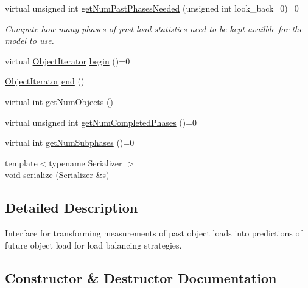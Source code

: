 \begin{DoxyCompactItemize}
virtual unsigned int \hyperlink{structvt_1_1vrt_1_1collection_1_1balance_1_1_load_model_ac061725720a2017908090863080b70e5}{get\+Num\+Past\+Phases\+Needed} (unsigned int look\+\_\+back=0)=0
\begin{DoxyCompactList}\small\item\em Compute how many phases of past load statistics need to be kept availble for the model to use. \end{DoxyCompactList}\item 
virtual \hyperlink{structvt_1_1vrt_1_1collection_1_1balance_1_1_object_iterator}{Object\+Iterator} \hyperlink{structvt_1_1vrt_1_1collection_1_1balance_1_1_load_model_a6ca139b4f14d79d1d59b46016efae221}{begin} ()=0
\item 
\hyperlink{structvt_1_1vrt_1_1collection_1_1balance_1_1_object_iterator}{Object\+Iterator} \hyperlink{structvt_1_1vrt_1_1collection_1_1balance_1_1_load_model_ab9258269a83575b36d7dd3b9a4121652}{end} ()
\item 
virtual int \hyperlink{structvt_1_1vrt_1_1collection_1_1balance_1_1_load_model_ab4027d0849dee5b28273094cc179abd2}{get\+Num\+Objects} ()
\item 
virtual unsigned int \hyperlink{structvt_1_1vrt_1_1collection_1_1balance_1_1_load_model_a999b155237ce8ba253019e783462a9aa}{get\+Num\+Completed\+Phases} ()=0
\item 
virtual int \hyperlink{structvt_1_1vrt_1_1collection_1_1balance_1_1_load_model_ab46ea62e4228d4a64de9dd0adfe81af2}{get\+Num\+Subphases} ()=0
\item 
{\footnotesize template$<$typename Serializer $>$ }\\void \hyperlink{structvt_1_1vrt_1_1collection_1_1balance_1_1_load_model_a52e2210225947697a235b75c385eb104}{serialize} (Serializer \&s)
\end{DoxyCompactItemize}


\subsection{Detailed Description}
Interface for transforming measurements of past object loads into predictions of future object load for load balancing strategies. 

\subsection{Constructor \& Destructor Documentation}
\mbox{\label{structvt_1_1vrt_1_1collection_1_1balance_1_1_load_model_a90f345e752441d66b2893027f2626226}} 
